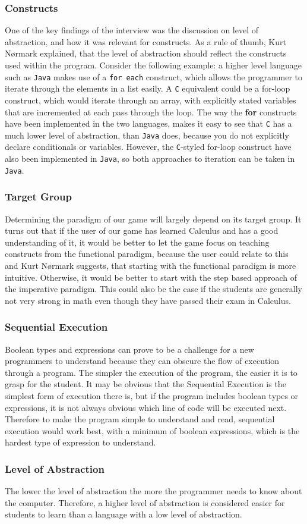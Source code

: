 \subsubsection{Constructs}

One of the key findings of the interview was the discussion on level of abstraction, and how it was relevant for constructs.
As a rule of thumb, Kurt N{\o}rmark explained, that the level of abstraction should reflect the constructs used within the program.
Consider the following example: a 
higher level language such as \texttt{Java} makes use of a \verb|for each| construct, which allows the programmer to iterate through the elements in a list easily.
A \texttt{C} equivalent could be a for-loop construct, which would iterate through an array, with explicitly stated variables that are incremented at each pass through the loop.
The way the \textbf{for} constructs have been implemented in the two languages, makes it easy to see that \texttt{C} has a much lower level of abstraction, than \texttt{Java} does, because you do not explicitly declare conditionals or variables. 
However, the \texttt{C}-styled for-loop construct have also been implemented in \texttt{Java}, so both approaches to iteration can be taken in \texttt{Java}.

\subsubsection{Target Group}

Determining the paradigm of our game will largely depend on its target group.
It turns out that if the user of our game has learned Calculus and has a good understanding of it, it would be better to let the game focus on teaching constructs from the functional paradigm, because the user could relate to this and Kurt N{\o}rmark suggests, that starting with the functional paradigm is more intuitive.
Otherwise, it would be better to start with the step based approach of the imperative paradigm.
This could also be the case if the students are generally not very strong in math even though they have passed their exam in Calculus.

\subsubsection{Sequential Execution}

Boolean types and expressions can prove to be a challenge for a new programmers to understand because they can obscure the flow of execution through a program.
The simpler the execution of the program, the easier it is to grasp for the student.
It may be obvious that the Sequential Execution is the simplest form of execution there is, but if the program includes boolean types or expressions, it is not always obvious which line of code will be executed next.
Therefore to make the program simple to understand and read, sequential execution would work best, with a minimum of boolean expressions, which is the hardest type of expression to understand.

\subsubsection{Level of Abstraction}

The lower the level of abstraction the more the programmer needs to know about the computer.
Therefore, a higher level of abstraction is considered easier for students to learn than a language with a low level of abstraction.
